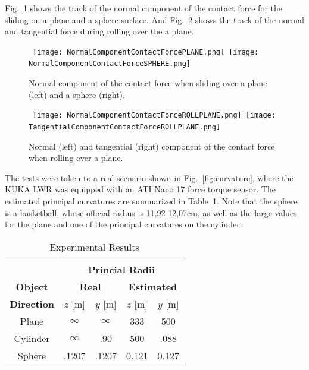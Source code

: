 Fig.~\ref{fig:NormCompContForce} shows the track of the normal component of the contact force for the sliding on a plane and a sphere surface. And Fig.~\ref{fig:TangCompForce} shows the track of the normal and tangential force during rolling over the a plane.

\begin{figure}[!t]
\centering
\mbox{
\texttt{[image: NormalComponentContactForcePLANE.png]}
\texttt{[image: NormalComponentContactForceSPHERE.png]}
}
\caption{Normal component of the contact force when sliding over a plane (left) and a sphere (right).}
\label{fig:NormCompContForce}
\end{figure}

\begin{figure}[!t]
\centering
\mbox{
\texttt{[image: NormalComponentContactForceROLLPLANE.png]}
\texttt{[image: TangentialComponentContactForceROLLPLANE.png]}
}
\caption{Normal (left) and tangential (right) component of the contact force when rolling over a plane.}
\label{fig:TangCompForce}
\end{figure}

The tests were taken to a real scenario shown in Fig.~\ref{fig:curvature}, where the KUKA LWR was equipped with an ATI Nano 17 force torque sensor. The estimated principal curvatures are summarized in Table~\ref{tab:results}. Note that the sphere is a basketball, whose official radius is 11,92-12,07cm, as well as the large values for the plane and one of the principal curvatures on the cylinder.

\begin{table}
\centering
\caption{Experimental Results}
\label{tab:results}
\begin{tabular}{ccccc}
    \toprule
    & \multicolumn{4}{c}{\textbf{Princial Radii}}\\
    \textbf{Object} & \multicolumn{2}{c}{\textbf{Real}} & \multicolumn{2}{c}{\textbf{Estimated}}\\
    \textbf{Direction} & $z$ [m] & $y$ [m] & $z$ [m] & $y$ [m]\\
    \toprule
    Plane & $\infty$ & $\infty$ & 333 & 500 \\
    Cylinder & $\infty$ & .90 & 500 & .088 \\
    Sphere & .1207 & .1207 & 0.121 & 0.127 \\
    \bottomrule
\end{tabular}
\end{table}

